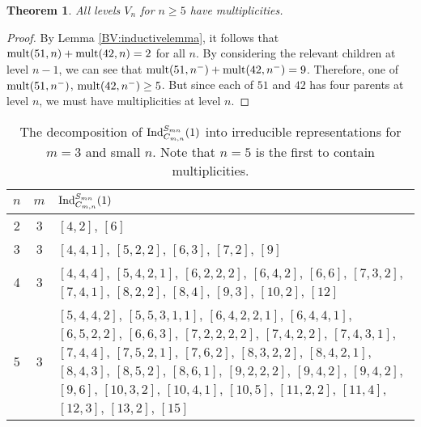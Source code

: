 \documentclass[12pt]{amsart}
\newtheorem{theorem}{Theorem}
\numberwithin{theorem}{section}
\newcommand{\Ind}{\textup{Ind}}
\newcommand{\mult}{\textup{mult}}
\begin{document}
\begin{theorem}\label{BV:multiplicities}
All levels $V_n$ for $n \ge 5$ have multiplicities.
\end{theorem}
\begin{proof}
By Lemma \ref{BV:inductivelemma}, it follows that $\mult(51,n) + \mult(42,n) = 2$ for all $n$.
By considering the relevant children at level $n-1$, we can see that $\mult(51,n^-) + \mult(42,n^-) = 9$.
 Therefore, one of
$\mult(51,n^-)$, $\mult(42,n^-) \ge 5$.
But since each of $51$ and $42$ has four parents at
level $n$, we must have multiplicities at level $n$.
\end{proof}

\begin{table}[h]
\caption{The decomposition of $\Ind_{C_{m,n}}^{S_{mn}}(1)$ into irreducible representations for $m=3$ and small $n$.
Note that $n=5$ is the first to contain multiplicities.}
\begin{center} 
    \begin{tabular}{|c|c|p{12cm}|}
    \hline
    $n$ & $m$ & $\Ind_{C_{m,n}}^{S_{mn}}(1)$ \\ \hline
    2 & 3 & $[4, 2]$, $[6]$ \\ \hline
    3 & 3 & $[4, 4, 1]$, $[5, 2, 2]$, $[6, 3]$, $[7, 2]$, $[9]$  \\ \hline
    4 & 3 & $[4, 4, 4]$, $[5, 4, 2, 1]$, $[6, 2, 2, 2]$, $[6, 4, 2]$, $[6, 6]$, $[7, 3, 2]$, $[7, 4, 1]$, $[8, 2, 2]$, $[8, 4]$, $[9, 3]$, $[10, 2]$, $[12]$ \\ \hline
    5 & 3 & $[5, 4, 4, 2]$, $[5, 5, 3, 1, 1]$, $[6, 4, 2, 2, 1]$, $[6, 4, 4, 1]$, $[6, 5, 2, 2]$, $[6, 6, 3]$, $[7, 2, 2, 2, 2]$, $[7, 4, 2, 2]$, $[7, 4, 3, 1]$, $[7, 4, 4]$, $[7, 5, 2, 1]$, $[7, 6, 2]$, $[8, 3, 2, 2]$, $[8, 4, 2, 1]$, $[8, 4, 3]$, $[8, 5, 2]$, $[8, 6, 1]$, $[9, 2, 2, 2]$, $[9, 4, 2]$, $[9, 4, 2]$, $[9, 6]$, $[10, 3, 2]$, $[10, 4, 1]$, $[10, 5]$, $[11, 2, 2]$, $[11, 4]$, $[12, 3]$, $[13, 2]$, $[15]$ \\ \hline
    \end{tabular}
\label{BV:table1}
\end{center}
\end{table}




\end{document}
